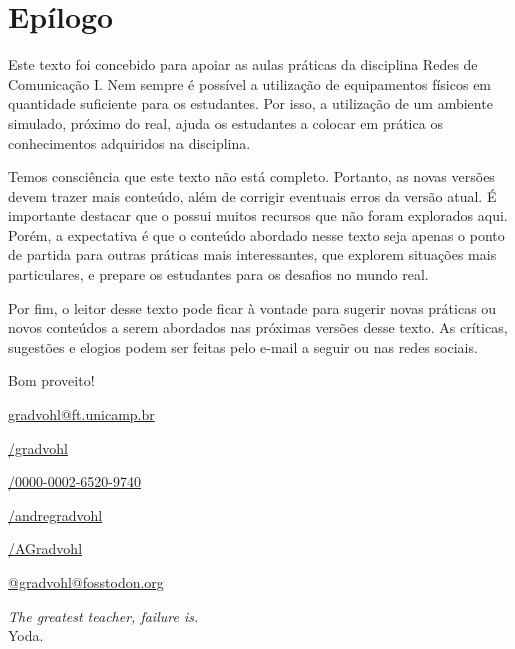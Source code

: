 \chapter*{Epílogo}\label{chp:epilogo}

Este texto foi concebido para apoiar as aulas práticas da disciplina Redes de Comunicação I. Nem sempre é possível a utilização de equipamentos físicos em quantidade suficiente para os estudantes. Por isso, a utilização de um ambiente simulado, próximo do real, ajuda os estudantes a colocar em prática os conhecimentos adquiridos na disciplina.

Temos consciência que este texto não está completo. Portanto, as novas versões devem trazer mais conteúdo, além de corrigir eventuais erros da versão atual.  É importante destacar que o \CPT possui muitos recursos que não foram explorados aqui. Porém, a expectativa é que o conteúdo abordado nesse texto seja apenas o ponto de partida para outras práticas mais interessantes, que explorem situações mais particulares, e prepare os estudantes para os desafios no mundo real. 

Por fim, o leitor desse texto pode ficar à vontade para sugerir novas práticas ou novos conteúdos a serem abordados nas próximas versões desse texto. As críticas, sugestões e elogios podem ser feitas pelo e-mail a seguir ou nas redes sociais.

Bom proveito!

\href{mailto://gradvohl@ft.unicamp.br}{\xspace gradvohl@ft.unicamp.br}

\href{https://github.com/gradvohl}{/gradvohl}

\href{https://orcid.org/0000-0002-6520-9740}{\textcolor{orcidlogocol}{}/0000-0002-6520-9740}

\href{https://www.linkedin.com/in/andregradvohl}{\textcolor{linkedinlogocol}{}/andregradvohl}

\href{https://twitter.com/AGradvohl}{\textcolor{twitterlogocol}{}/AGradvohl}

\href{https://fosstodon.org/@gradvohl}{\textcolor{mastodonlogocol}{} @gradvohl@fosstodon.org}

\vspace*{\fill}
\begin{flushright}
    \textit{The greatest teacher, failure is.}\\
    Yoda.
\end{flushright}

